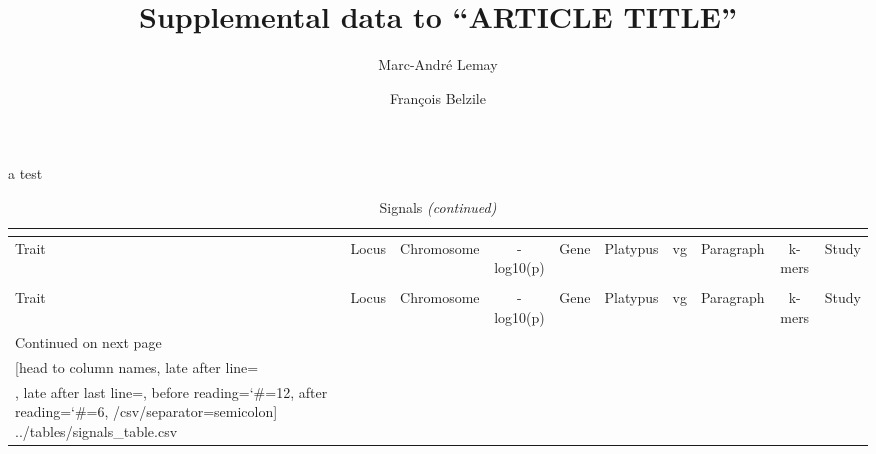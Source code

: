 \documentclass[12pt]{article}
\title{Supplemental data to ``ARTICLE TITLE''}
\author{Marc-André Lemay \and François Belzile}
\date{}
\begin{document}
\maketitle \thispagestyle{empty}

\tableofcontents

\vspace{4ex}

\listoftables

\thispagestyle{empty}

\vspace{4ex}

\listoffigures


\clearpage

\begin{landscape} \footnotesize
	\begin{ThreePartTable}

		\begin{TableNotes}
		\item[a] test
		\end{TableNotes}

		\begin{longtable}{llcclccccl}

			\caption{Signals}\\
			\label{signals_table}\\

			\toprule
			Trait & Locus & Chromosome & -log10(p) & Gene & Platypus & vg & Paragraph & k-mers  & Study \\
			\midrule \endfirsthead

			\caption[]{Signals \emph{(continued)}}\\

			\toprule
			Trait & Locus & Chromosome & -log10(p) & Gene & Platypus & vg & Paragraph & k-mers  & Study \\
			\midrule
			\endhead

			\bottomrule
			Continued on next page \\
			\endfoot

			\bottomrule \insertTableNotes
			\endlastfoot
			\csvreader[head to column names,
			late after line=\\,
			late after last line=,
			before reading={\catcode`\#=12},
			after reading={\catcode`\#=6},
			/csv/separator=semicolon]%
			{../tables/signals_table.csv}{}{\Trait & \Locus & \Chromosome & \Pvalues & \Gene & \Platypus & \Vg & \Paragraph & \Kmers & \Study}

		\end{longtable}

	\end{ThreePartTable}

\end{landscape}
\clearpage
\end{document}
